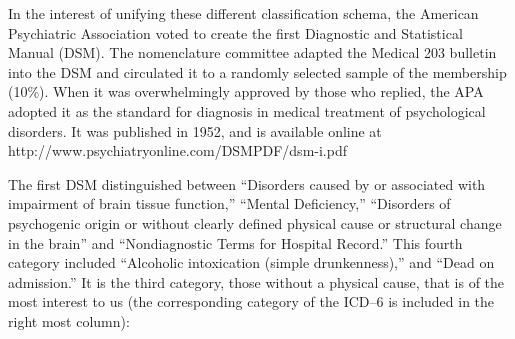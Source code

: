 In the interest of unifying these different classification schema, the American Psychiatric Association voted to create the first Diagnostic and Statistical Manual (DSM). The nomenclature committee adapted the Medical 203 bulletin into the DSM and circulated it to a randomly selected sample of the membership (10\%). When it was overwhelmingly approved by those who replied, the APA adopted it as the standard for diagnosis in medical treatment of psychological disorders. It was published in 1952, and is available online at http:\slash \slash www.psychiatryonline.com\slash DSMPDF\slash dsm-i.pdf

The first DSM distinguished between “Disorders caused by or associated with impairment of brain tissue function,” “Mental Deficiency,” “Disorders of psychogenic origin or without clearly defined physical cause or structural change in the brain” and “Nondiagnostic Terms for Hospital Record.” This fourth category included “Alcoholic intoxication (simple drunkenness),” and “Dead on admission.” It is the third category, those without a physical cause, that is of the most interest to us (the corresponding category of the ICD--6 is included in the right most column):
